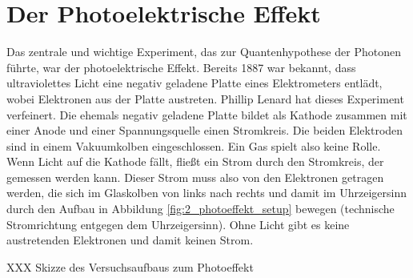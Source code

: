 


\section{Der Photoelektrische Effekt}

Das zentrale und wichtige Experiment, das zur Quantenhypothese der Photonen führte, war der photoelektrische Effekt. Bereits 1887 war bekannt, dass ultraviolettes Licht eine negativ geladene Platte eines Elektrometers entlädt, wobei Elektronen aus der Platte austreten. Phillip Lenard hat dieses Experiment verfeinert. Die ehemals negativ geladene Platte bildet als Kathode zusammen mit einer Anode und einer Spannungsquelle einen Stromkreis. Die beiden Elektroden sind in einem Vakuumkolben eingeschlossen. Ein Gas spielt also keine Rolle. Wenn Licht auf die Kathode fällt, fließt ein Strom durch den Stromkreis, der gemessen werden kann. Dieser Strom muss also von den Elektronen getragen werden, die sich im Glaskolben von links nach rechts und damit im Uhrzeigersinn durch den Aufbau in Abbildung  \ref{fig:2_photoeffekt_setup} bewegen
(technische Stromrichtung entgegen dem Uhrzeigersinn). Ohne Licht gibt es keine austretenden Elektronen und damit keinen Strom.

\begin{marginfigure}
 \caption{XXX Skizze des Versuchsaufbaus zum Photoeffekt}
 \label{fig:2_photoeffekt_setup}
\end{marginfigure}


